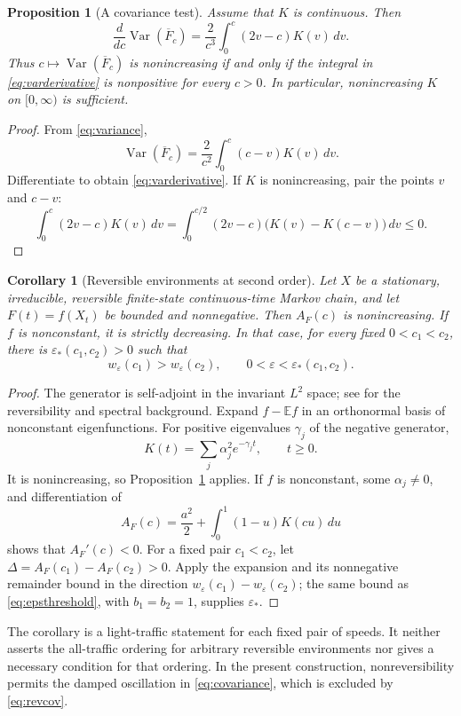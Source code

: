 \documentclass[aap,preprint]{imsart}
\numberwithin{equation}{section}
\theoremstyle{plain}
\newtheorem{proposition}[theorem]{Proposition}
\newtheorem{corollary}[theorem]{Corollary}
\theoremstyle{definition}
\newcommand{\E}{\mathbb E}
\newcommand{\1}{\mathbf 1}
\newcommand{\eps}{\varepsilon}
\DeclareMathOperator{\Var}{Var}
\begin{document}
\begin{proposition}[A covariance test]\label{prop:derivative}
Assume that $K$ is continuous. Then
\begin{equation}\label{eq:varderivative}
 \frac{d}{dc}\Var(\overline F_c)
 =\frac2{c^3}\int_0^c(2v-c)K(v)\,dv.
\end{equation}
Thus $c\mapsto\Var(\overline F_c)$ is nonincreasing if and only if the integral in \eqref{eq:varderivative} is nonpositive for every $c>0$. In particular, nonincreasing $K$ on $[0,\infty)$ is sufficient.
\end{proposition}
\begin{proof}
From \eqref{eq:variance},
\[
 \Var(\overline F_c)=\frac2{c^2}\int_0^c(c-v)K(v)\,dv.
\]
Differentiate to obtain \eqref{eq:varderivative}. If $K$ is nonincreasing, pair the points $v$ and $c-v$:
\[
 \int_0^c(2v-c)K(v)\,dv
 =\int_0^{c/2}(2v-c)\bigl(K(v)-K(c-v)\bigr)\,dv\le0.
\]
\end{proof}

\begin{corollary}[Reversible environments at second order]\label{cor:reversible}
Let $X$ be a stationary, irreducible, reversible finite-state continuous-time Markov chain, and let $F(t)=f(X_t)$ be bounded and nonnegative. Then $A_F(c)$ is nonincreasing. If $f$ is nonconstant, it is strictly decreasing. In that case, for every fixed $0<c_1<c_2$, there is $\eps_*(c_1,c_2)>0$ such that
\[
 w_\eps(c_1)>w_\eps(c_2),\qquad 0<\eps<\eps_*(c_1,c_2).
\]
\end{corollary}
\begin{proof}
The generator is self-adjoint in the invariant $L^2$ space; see \cite{Kelly79,LevinPeres17} for the reversibility and spectral background. Expand $f-\E f$ in an orthonormal basis of nonconstant eigenfunctions. For positive eigenvalues $\gamma_j$ of the negative generator,
\begin{equation}\label{eq:revcov}
 K(t)=\sum_j\alpha_j^2 e^{-\gamma_j t},\qquad t\ge0.
\end{equation}
It is nonincreasing, so Proposition~\ref{prop:derivative} applies. If $f$ is nonconstant, some $\alpha_j\ne0$, and differentiation of
\[
 A_F(c)=\frac{a^2}{2}+\int_0^1(1-u)K(cu)\,du
\]
shows that $A_F'(c)<0$. For a fixed pair $c_1<c_2$, let $\Delta=A_F(c_1)-A_F(c_2)>0$. Apply the expansion and its nonnegative remainder bound in the direction $w_\eps(c_1)-w_\eps(c_2)$; the same bound as \eqref{eq:epsthreshold}, with $b_1=b_2=1$, supplies $\eps_*$.
\end{proof}
The corollary is a light-traffic statement for each fixed pair of speeds. It neither asserts the all-traffic ordering for arbitrary reversible environments nor gives a necessary condition for that ordering. In the present construction, nonreversibility permits the damped oscillation in \eqref{eq:covariance}, which is excluded by \eqref{eq:revcov}.
\end{document}
